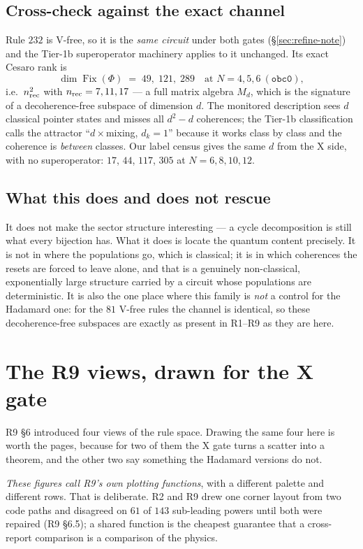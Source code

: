 \documentclass[11pt]{article}
\newcommand{\rt}[1]{\texttt{#1}}
\theoremstyle{plain}
\theoremstyle{definition}
\begin{document}
\subsection{Cross-check against the exact channel}

Rule $232$ is V-free, so it is the \emph{same circuit} under both gates
(\S\ref{sec:refine-note}) and the Tier-1b superoperator machinery applies to it
unchanged. Its exact Cesaro rank is
\[
\dim\operatorname{Fix}(\Phi)\;=\;49,\;121,\;289 \quad\text{at } N=4,5,6\ (\rt{obc0}),
\]
i.e.\ $n_{\rm rec}^2$ with $n_{\rm rec}=7,11,17$ --- a full matrix algebra $M_d$,
which is the signature of a decoherence-free subspace of dimension $d$. The
monitored description sees $d$ classical pointer states and misses all $d^2-d$
coherences; the Tier-1b classification calls the attractor
``$d\times$mixing, $d_k=1$'' because it works class by class and the coherence is
\emph{between} classes. Our label census gives the same $d$ from the X side, with
no superoperator: $17$, $44$, $117$, $305$ at $N=6,8,10,12$.

\subsection{What this does and does not rescue}

It does not make the sector structure interesting --- a cycle decomposition is
still what every bijection has. What it does is locate the quantum content
precisely. It is not in where the populations go, which is classical; it is in
which coherences the resets are forced to leave alone, and that is a genuinely
non-classical, exponentially large structure carried by a circuit whose
populations are deterministic. It is also the one place where this family is
\emph{not} a control for the Hadamard one: for the $81$ V-free rules the channel
is identical, so these decoherence-free subspaces are exactly as present in R1--R9
as they are here.

\section{The R9 views, drawn for the X gate}
\label{sec:r9views}

R9 \S6 introduced four views of the rule space. Drawing the same four here is
worth the pages, because for two of them the X gate turns a scatter into a
theorem, and the other two say something the Hadamard versions do not.

\emph{These figures call R9's own plotting functions}, with a different palette
and different rows. That is deliberate. R2 and R9 drew one corner layout from two
code paths and disagreed on $61$ of $143$ sub-leading powers until both were
repaired (R9 \S6.5); a shared function is the cheapest guarantee that a
cross-report comparison is a comparison of the physics.
\end{document}
